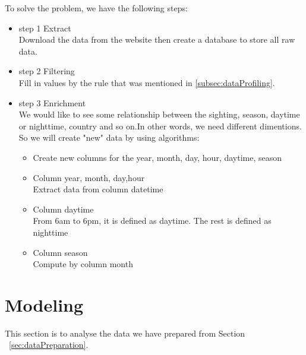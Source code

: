 \documentclass[11pt, journal]{IEEEtran}
\begin{document}
To solve the problem, we have the following steps:
\begin{itemize}
  \item step 1 Extract \\
  Download the data from the website then create a database to store all raw data.
  \item step 2 Filtering\\
  Fill in values by the rule that was mentioned in \ref{subsec:dataProfiling}.
  \item step 3 Enrichment\\
  We would like to see some relationship between the sighting, season, daytime or nighttime, country and so on.In other words, we need different dimentions. So we will create "new" data by using algorithms:
  \begin{itemize}
      \item Create new columns for the year, month, day, hour, daytime, season
      \item Column year, month, day,hour\\
      Extract data from column datetime
      \item Column daytime\\
      From 6am to 6pm, it is defined as daytime. The rest is defined as nighttime
      \item Column season\\
      Compute by column month
  \end{itemize}
  
\end{itemize}

\section{Modeling} \label{sec:modeling}
This section is to analyse the data we have prepared from Section ~\ref{sec:dataPreparation}.
\end{document}
